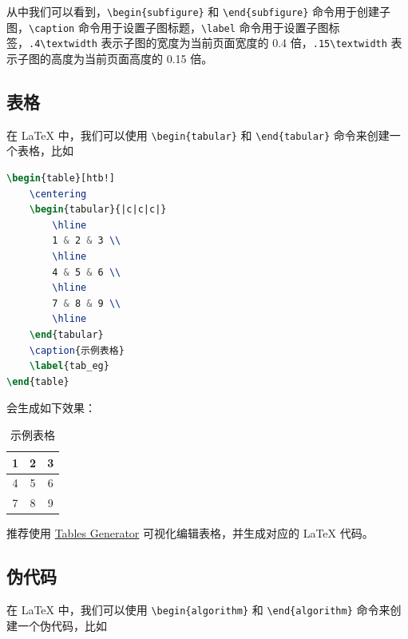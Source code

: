 从中我们可以看到，\texttt{\textbackslash begin\{subfigure\}} 和 \texttt{\textbackslash end\{subfigure\}} 命令用于创建子图，\texttt{\textbackslash caption} 命令用于设置子图标题，\texttt{\textbackslash label} 命令用于设置子图标签，\texttt{.4\textbackslash textwidth} 表示子图的宽度为当前页面宽度的 0.4 倍，\texttt{.15\textbackslash textwidth} 表示子图的高度为当前页面高度的 0.15 倍。

\subsection{表格}

在 LaTeX 中，我们可以使用 \texttt{\textbackslash begin\{tabular\}} 和 \texttt{\textbackslash end\{tabular\}} 命令来创建一个表格，比如

\begin{lstlisting}[language=TeX]
\begin{table}[htb!]
    \centering
    \begin{tabular}{|c|c|c|}
        \hline
        1 & 2 & 3 \\
        \hline
        4 & 5 & 6 \\
        \hline
        7 & 8 & 9 \\
        \hline
    \end{tabular}
    \caption{示例表格}
    \label{tab_eg}
\end{table}
\end{lstlisting}

\noindent 会生成如下效果：

\begin{table}[htb!]
    \centering
    \begin{tabular}{|c|c|c|}
        \hline
        1 & 2 & 3 \\
        \hline
        4 & 5 & 6 \\
        \hline
        7 & 8 & 9 \\
        \hline
    \end{tabular}
    \caption{示例表格}
    \label{tab_eg}
\end{table}

推荐使用 \href{https://www.tablesgenerator.com/}{Tables Generator} 可视化编辑表格，并生成对应的 LaTeX 代码。

\subsection{伪代码}

在 LaTeX 中，我们可以使用 \texttt{\textbackslash begin\{algorithm\}} 和 \texttt{\textbackslash end\{algorithm\}} 命令来创建一个伪代码，比如

